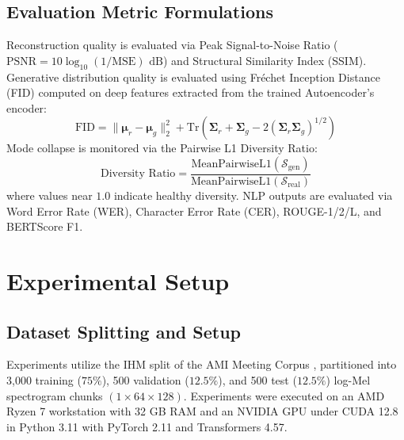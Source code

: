 \documentclass[conference]{IEEEtran}
\begin{document}
\subsection{Evaluation Metric Formulations}
Reconstruction quality is evaluated via Peak Signal-to-Noise Ratio ($\text{PSNR} = 10 \log_{10}(1 / \text{MSE})\text{ dB}$) and Structural Similarity Index (SSIM). Generative distribution quality is evaluated using Fr\'echet Inception Distance (FID) computed on deep features extracted from the trained Autoencoder's encoder:
\begin{equation}
\text{FID} = \|\boldsymbol{\mu}_r - \boldsymbol{\mu}_g\|_2^2 + \text{Tr}\left( \boldsymbol{\Sigma}_r + \boldsymbol{\Sigma}_g - 2\left(\boldsymbol{\Sigma}_r \boldsymbol{\Sigma}_g\right)^{1/2} \right)
\end{equation}
Mode collapse is monitored via the Pairwise L1 Diversity Ratio:
\begin{equation}
\text{Diversity Ratio} = \frac{\text{MeanPairwiseL1}(\mathcal{S}_{\text{gen}})}{\text{MeanPairwiseL1}(\mathcal{S}_{\text{real}})}
\end{equation}
where values near $1.0$ indicate healthy diversity. NLP outputs are evaluated via Word Error Rate (WER), Character Error Rate (CER), ROUGE-1/2/L, and BERTScore F1.

\section{Experimental Setup}
\label{sec:exp_setup}

\subsection{Dataset Splitting and Setup}
Experiments utilize the IHM split of the AMI Meeting Corpus \cite{carletta2005ami}, partitioned into 3,000 training ($75\%$), 500 validation ($12.5\%$), and 500 test ($12.5\%$) log-Mel spectrogram chunks $(1 \times 64 \times 128)$. Experiments were executed on an AMD Ryzen 7 workstation with 32 GB RAM and an NVIDIA GPU under CUDA 12.8 in Python 3.11 with PyTorch 2.11 and Transformers 4.57.
\end{document}
